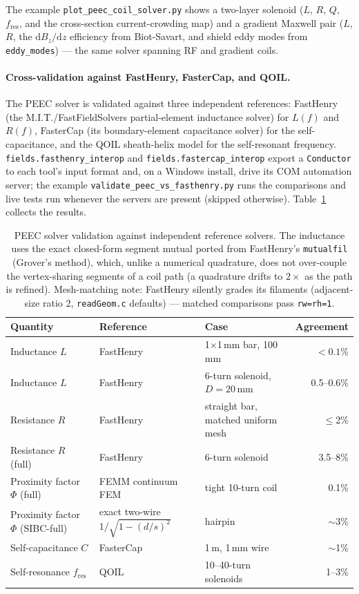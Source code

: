 \documentclass[11pt,oneside]{report}
\newcommand{\code}[1]{\texttt{#1}}
\begin{document}
The example \code{plot\_peec\_coil\_solver.py} shows a two-layer solenoid (\(L\), \(R\),
\(Q\), \(f_{\text{res}}\), and the cross-section current-crowding map) and a gradient
Maxwell pair (\(L\), \(R\), the \(\mathrm dB_z/\mathrm dz\) efficiency from Biot-Savart, and
shield eddy modes from \code{eddy\_modes}) --- the same solver spanning RF and gradient
coils.

\paragraph{Cross-validation against FastHenry, FasterCap, and QOIL.} The PEEC solver is
validated against three independent references: FastHenry (the M.I.T./FastFieldSolvers
partial-element inductance solver) for \(L(f)\) and \(R(f)\), FasterCap (its boundary-element
capacitance solver) for the self-capacitance, and the QOIL sheath-helix model for the
self-resonant frequency. \code{fields.fasthenry\_interop} and
\code{fields.fastercap\_interop} export a \code{Conductor} to each tool's input format and,
on a Windows install, drive its COM automation server; the example
\code{validate\_peec\_vs\_fasthenry.py} runs the comparisons and live tests run whenever the
servers are present (skipped otherwise). Table~\ref{tab:peec-validation} collects the
results.

\begin{table}[h]
\centering
\small
\begin{tabular}{@{}lllr@{}}
\toprule
Quantity & Reference & Case & Agreement \\
\midrule
Inductance \(L\)      & FastHenry & 1\(\times\)1\,mm bar, 100\,mm        & \(<0.1\)\% \\
Inductance \(L\)      & FastHenry & 6-turn solenoid, \(D=20\)\,mm        & 0.5--0.6\% \\
Resistance \(R\)      & FastHenry & straight bar, matched uniform mesh  & \(\le\)2\% \\
Resistance \(R\) (full) & FastHenry & 6-turn solenoid                   & 3.5--8\% \\
Proximity factor \(\Phi\) (full) & FEMM continuum FEM & tight 10-turn coil & 0.1\% \\
Proximity factor \(\Phi\) (SIBC-full) & exact two-wire \(1/\sqrt{1-(d/s)^2}\) & hairpin & \(\sim\)3\% \\
Self-capacitance \(C\)& FasterCap & 1\,m, 1\,mm wire                    & \(\sim\)1\% \\
Self-resonance \(f_{\text{res}}\) & QOIL & 10--40-turn solenoids       & 1--3\% \\
\bottomrule
\end{tabular}
\caption{PEEC solver validation against independent reference solvers. The inductance uses
the exact closed-form segment mutual ported from FastHenry's \code{mutualfil} (Grover's
method), which, unlike a numerical quadrature, does not over-couple the vertex-sharing
segments of a coil path (a quadrature drifts to \(2\times\) as the path is refined).
Mesh-matching note: FastHenry silently grades its filaments (adjacent-size ratio 2,
\code{readGeom.c} defaults) --- matched comparisons pass \code{rw=rh=1}.}
\label{tab:peec-validation}
\end{table}
\end{document}
